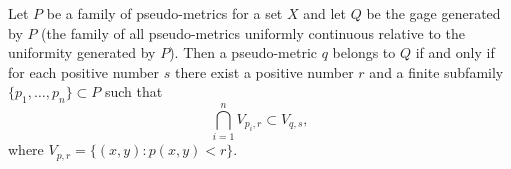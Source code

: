 Let $P$ be a family of pseudo-metrics for a set $X$ and let $Q$ be the gage generated by $P$ (the family of all pseudo-metrics uniformly continuous relative to the uniformity generated by $P$). Then a pseudo-metric $q$ belongs to $Q$ if and only if for each positive number $s$ there exist a positive number $r$ and a finite subfamily $\{p_1, \dots, p_n\} \subset P$ such that
$$\bigcap_{i=1}^{n} V_{p_i, r} \subset V_{q, s},$$
where $V_{p,r} = \{(x,y) : p(x,y) < r\}$.
